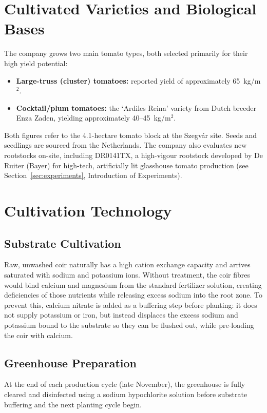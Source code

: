 \section{Cultivated Varieties and Biological Bases}
\label{sec:varieties}
The company grows two main tomato types, both selected primarily for their high yield potential:
\begin{itemize}
    \item \textbf{Large-truss (cluster) tomatoes:} reported yield of approximately 65~kg/m$^2$.
    \item \textbf{Cocktail/plum tomatoes:} the `Ardiles Reina' variety from Dutch breeder Enza Zaden, yielding approximately 40--45~kg/m$^2$.
\end{itemize}
Both figures refer to the 4.1-hectare tomato block at the Szegvár site. Seeds and seedlings are sourced from the Netherlands. The company also evaluates new rootstocks on-site, including DR0141TX, a high-vigour rootstock developed by De Ruiter (Bayer) for high-tech, artificially lit glasshouse tomato production (see Section~\ref{sec:experiments}, Introduction of Experiments).

\section{Cultivation Technology}
\label{sec:cultivation-technology}

\subsection{Substrate Cultivation}
Raw, unwashed coir naturally has a high cation exchange capacity and arrives saturated with sodium and potassium ions. Without treatment, the coir fibres would bind calcium and magnesium from the standard fertilizer solution, creating deficiencies of those nutrients while releasing excess sodium into the root zone. To prevent this, calcium nitrate is added as a buffering step before planting: it does not supply potassium or iron, but instead displaces the excess sodium and potassium bound to the substrate so they can be flushed out, while pre-loading the coir with calcium.

\subsection{Greenhouse Preparation}
At the end of each production cycle (late November), the greenhouse is fully cleared and disinfected using a sodium hypochlorite solution before substrate buffering and the next planting cycle begin.


